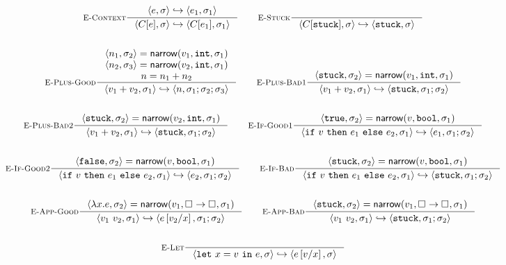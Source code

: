 \begin{figure*}
\begin{gather*}
\inference[\recontext]
  {\step{e}{\su}{e_1}{\su_1}}
  {\step{C[e]}{\su}{C[e_1]}{\su_1}}
\qquad
\inference[\restuck]
  {}
  {\step{C[\stuck]}{\su}{\stuck}{\su}}
\\ \\
\inference[\replusgood]
  {\pair{n_1}{\su_2} = \force{v_1}{\tint}{\su_1} \\
   \pair{n_2}{\su_3} = \force{v_2}{\tint}{\su_1} \\
   n = \eplus{n_1}{n_2}}
  {\step{\eplus{v_1}{v_2}}{\su_1}{n}{\su_1;\su_2;\su_3}}
\qquad
\inference[\replusbadone]
  {\pair{\stuck}{\su_2} = \force{v_1}{\tint}{\su_1}}
  {\step{\eplus{v_1}{v_2}}{\su_1}{\stuck}{\su_1;\su_2}}
\\ \\
\inference[\replusbadtwo]
  {\pair{\stuck}{\su_2} = \force{v_2}{\tint}{\su_1}}
  {\step{\eplus{v_1}{v_2}}{\su_1}{\stuck}{\su_1;\su_2}}
\qquad
\inference[\reifgoodone]
  {\pair{\etrue}{\su_2} = \force{v}{\tbool}{\su_1}}
  {\step{\eif{v}{e_1}{e_2}}{\su_1}{e_1}{\su_1;\su_2}}
\\ \\
\inference[\reifgoodtwo]
  {\pair{\efalse}{\su_2} = \force{v}{\tbool}{\su_1}}
  {\step{\eif{v}{e_1}{e_2}}{\su_1}{e_2}{\su_1;\su_2}}
\qquad
\inference[\reifbad]
  {\pair{\stuck}{\su_2} = \force{v}{\tbool}{\su_1}}
  {\step{\eif{v}{e_1}{e_2}}{\su_1}{\stuck}{\su_1;\su_2}}
\\ \\
\inference[\reappgood]
  {\pair{\efun{x}{e}}{\su_2} = \force{v_1}{\tfun{\thole{}}{\thole{}}}{\su_1}}
  {\step{\eapp{v_1}{v_2}}{\su_1}{e\sub{x}{v_2}}{\su_1;\su_2}}
\qquad
\inference[\reappbad]
  {\pair{\stuck}{\su_2} = \force{v_1}{\tfun{\thole{}}{\thole{}}}{\su_1}}
  {\step{\eapp{v_1}{v_2}}{\su_1}{\stuck}{\su_1;\su_2}}
\\ \\
\inference[\relet]
  {}
  {\step{\elet{x}{v}{e}}{\su}{e\sub{x}{v}}{\su}}
\end{gather*}
\\ %

\end{figure*}
